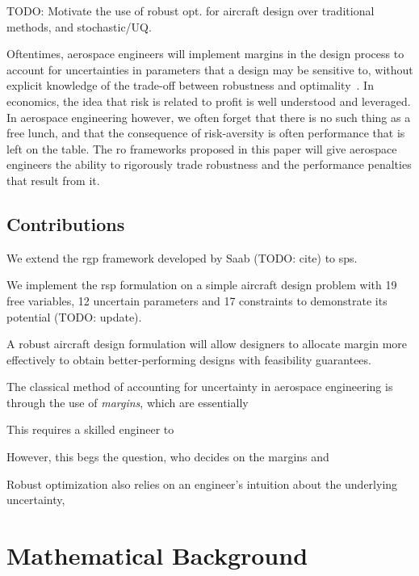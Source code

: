 TODO: Motivate the use of robust opt. for aircraft design over traditional methods, and stochastic/UQ.

Oftentimes, aerospace engineers will implement
margins in the design process to account for uncertainties in parameters that a design may be sensitive to,
without explicit knowledge of the trade-off between robustness and optimality~\cite{yao2011}.
In economics, the idea that risk is related to profit is well understood and leveraged.
In aerospace engineering however, we often forget that there is no such thing as a free lunch,
and that the consequence of risk-aversity
is often performance that is left on the table. The \gls{ro} frameworks proposed in this paper will
give aerospace engineers the ability to rigorously trade robustness and the performance penalties
that result from it.

\subsection{Contributions}

We extend the \gls{rgp} framework developed by Saab (TODO: cite) to \gls{sp}s.

We implement the \gls{rsp} formulation on a simple aircraft design problem with 19 free variables,
12 uncertain parameters and 17 constraints to demonstrate its potential (TODO: update).

A robust aircraft design formulation will allow designers to allocate margin more effectively
to obtain better-performing designs with feasibility guarantees.


The classical method of accounting for uncertainty in aerospace engineering is through
the use of \textit{margins}, which are essentially

This requires a skilled engineer to

However, this begs the question, who decides on the margins and

Robust optimization also relies on an engineer's intuition about the underlying uncertainty,

\section{Mathematical Background}
